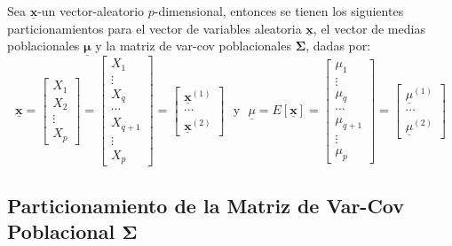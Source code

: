\documentclass[
]{book}
\theoremstyle{definition}
\theoremstyle{definition}
\theoremstyle{definition}
\theoremstyle{definition}
\theoremstyle{remark}
\begin{document}
Sea \(\underline{\mathbf{x}}\)-un vector-aleatorio \(p\)-dimensional, entonces se tienen los siguientes particionamientos para el vector de variables aleatoria \(\underline{\mathbf{x}}\), el vector de medias poblacionales \(\underline{\mathbf{\mu}}\) y la matriz de var-cov poblacionales \(\mathbf{\Sigma}\), dadas por:
\[
\underline{\mathbf{x}}=\begin{bmatrix}
X_1 \\ X_2 \\  \vdots  \\ X_p
\end{bmatrix}=\begin{bmatrix}
X_1 \\ \vdots \\ X_q \\ \cdots \\ X_{q+1} \\ \vdots  \\ X_p
\end{bmatrix} =\begin{bmatrix}
\underline{\mathbf{x}}^{(1)} \\ \cdots \\ \underline{\mathbf{x}}^{(2)}
\end{bmatrix} \ \ \ \text{y} \ \ \
\underline{\mu}=E[\underline{\mathbf{x}}]=\begin{bmatrix}
\mu_1 \\ \vdots \\ \mu_q \\ \cdots \\ \mu_{q+1} \\ \vdots  \\ \mu_p
\end{bmatrix} =\begin{bmatrix}
\underline{\mu}^{(1)} \\ \cdots \\ \underline{\mu}^{(2)}
\end{bmatrix}
\]

\hypertarget{particionamiento-de-la-matriz-de-var-cov-poblacional-mathbfsigma}{%
\subsection{\texorpdfstring{Particionamiento de la Matriz de Var-Cov Poblacional \(\mathbf{\Sigma}\)}{Particionamiento de la Matriz de Var-Cov Poblacional \textbackslash mathbf\{\textbackslash Sigma\}}}\label{particionamiento-de-la-matriz-de-var-cov-poblacional-mathbfsigma}}
\end{document}
